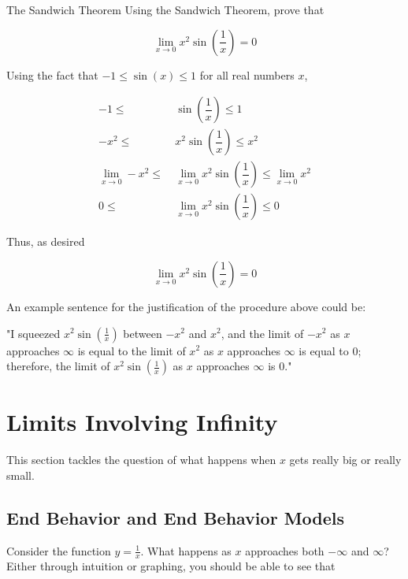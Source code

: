 \begin{example}{The Sandwich Theorem}
    Using the Sandwich Theorem, prove that
    
    \[ \lim_{x \to 0} x^2 \sin{\left( \dfrac{1}{x} \right)} = 0 \]
    
    Using the fact that \( -1 \le \sin{\left( x \right)} \le 1 \) for all real numbers \( x \),
    
    \begin{align}
        -1 \le \> &\sin{\left( \dfrac{1}{x} \right)} \le 1 \\
        -x^2 \le \> &x^2 \sin{\left( \dfrac{1}{x} \right)} \le x^2 \\
        \lim_{x \to 0} -x^2 \le \> &\lim_{x \to 0} x^2 \sin{\left( \dfrac{1}{x} \right)} \le \lim_{x \to 0} x^2 \\
        0 \le \> &\lim_{x \to 0} x^2 \sin{\left( \dfrac{1}{x} \right)} \le 0
    \end{align}
    
    Thus, as desired
    
    \[ \lim_{x \to 0} x^2 \sin{\left( \dfrac{1}{x} \right)} = 0 \]
    
    An example sentence for the justification of the procedure above could be:
    
    "I squeezed \( x^2 \sin{\left( \frac{1}{x} \right)} \) between \( -x^2 \) and \( x^2 \), and the limit of \( -x^2 \) as \( x \) approaches \( \infty \) is equal to the limit of \( x^2 \) as \( x \) approaches \( \infty \) is equal to \( 0 \); therefore, the limit of \( x^2 \sin{\left( \frac{1}{x} \right)} \) as \( x \) approaches \( \infty \) is \( 0 \)."
\end{example}

\section{Limits Involving Infinity}

This section tackles the question of what happens when \( x \) gets really big or really small.

\subsection{End Behavior and End Behavior Models}

Consider the function \( y = \frac{1}{x} \). What happens as \( x \) approaches both \( -\infty \) and \( \infty \)? Either through intuition or graphing, you should be able to see that

